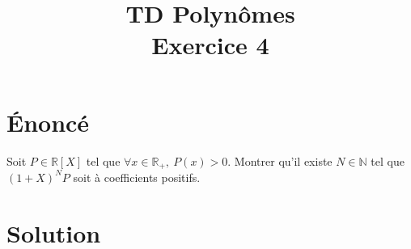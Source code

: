 \documentclass[french]{article}
\title{TD Polynômes\\ Exercice 4}
\date{}
\newcommand{\N}{\mathbb{N}}
\newcommand{\R}{\mathbb{R}}
\begin{document}
\maketitle

\section{Énoncé}
Soit $P\in\R[X]$ tel que $\forall x\in\R_+,\ P(x)>0$. Montrer qu'il existe $N\in\N$ tel que $(1+X)^NP$ soit à coefficients positifs.
\section{Solution}
\end{document}
